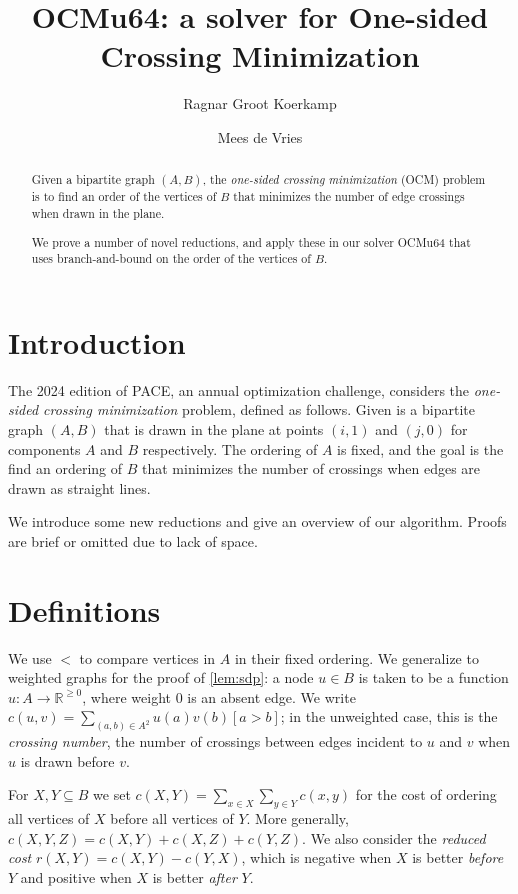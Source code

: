 \documentclass[a4paper,UKenglish,cleveref, autoref, thm-restate]{lipics-v2021}
\title{OCMu64: a solver for One-sided Crossing Minimization} %
\author{Ragnar {Groot Koerkamp}}{ETH Zurich, Switzerland}{ragnar.grootkoerkamp@gmail.com}{https://orcid.org/0000-0002-2091-1237}{}%
\author{Mees de Vries}{Unaffiliated, Netherlands}{meesdevries@protonmail.com}{}{}
\begin{document}
\maketitle

\begin{abstract}
  Given a bipartite graph $(A,B)$, the \emph{one-sided crossing minimization} (OCM) problem is to find an order of the
  vertices of $B$ that minimizes the number
  of edge crossings when drawn in the plane.

  We prove a number of novel reductions, and apply these in our solver OCMu64 that
  uses branch-and-bound on the order of the vertices of $B$.
\end{abstract}

\section{Introduction}

The 2024 edition of PACE, an annual optimization challenge, considers the
\emph{one-sided crossing minimization} problem, defined as follows.
Given is a bipartite graph $(A, B)$ that is drawn in the plane at points
$(i, 1)$ and $(j,0)$ for components $A$ and $B$ respectively. The ordering of $A$
is fixed, and the goal is the find an ordering of $B$ that minimizes the number of
crossings when edges are drawn as straight lines.

We introduce some new reductions and give an overview of our algorithm. Proofs are brief or
omitted due to lack of space.

\section{Definitions}
We use $<$ to compare vertices in $A$ in their fixed ordering. We generalize to weighted graphs
for the proof of \ref{lem:sdp}: a node $u \in B$ is taken to be a function $u: A \to \mathbb
R^{\geq 0}$, where weight 0 is an absent edge. We write $c(u, v) = \sum_{(a, b) \in A^2}
u(a)v(b)[a > b]$; in the unweighted case, this is the \emph{crossing number}, the number of
crossings between edges incident to $u$ and $v$ when $u$ is drawn before $v$. 

For $X,Y\subseteq B$ we set $c(X,Y) = \sum_{x\in X}\sum_{y\in Y} c(x,y)$ for the cost of
ordering all vertices of $X$ before all vertices of $Y$. More generally, $c(X,Y,Z) = c(X, Y) +
c(X, Z) + c(Y, Z)$. We also consider the \emph{reduced cost} $r(X,Y) = c(X, Y) - c(Y, X)$,
which is negative when $X$ is better \emph{before} $Y$ and positive when $X$ is better
\emph{after} $Y$.
\end{document}
